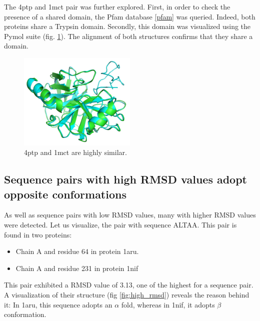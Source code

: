 \documentclass[a4paper, 11pt]{article} %
\begin{document}
The 4ptp and 1mct pair was further explored. First, in order to check the presence of a shared domain, the Pfam database \ref{pfam} was queried. Indeed, both proteins share a Trypsin domain. Secondly, this domain was visualized using the Pymol suite (fig. \ref{fig:perfect_match}). The alignment of both structures confirms that they share a domain.

\begin{figure}[!h]
\begin{center}
    \includegraphics[width = 0.5\textwidth]{../plots/perfect_match_white.png}
  \end{center}
  \label{fig:perfect_match}
  \caption{4ptp and 1mct are highly similar.}
\end{figure}

\subsection{Sequence pairs with high RMSD values adopt opposite conformations}

As well as sequence pairs with low RMSD values, many with higher RMSD values were detected. Let us visualize, the pair with sequence ALTAA. This pair is found in two proteins:

\begin{itemize}

\item Chain A and residue 64 in protein 1aru.

\item Chain A and residue 231 in protein 1nif

\end{itemize} 

This pair exhibited a RMSD value of 3.13, one of the highest for a sequence pair. A visualization of their structure (fig \ref{fig:high_rmsd}) reveals the reason behind it: In 1aru, this sequence adopts an $\alpha$ fold, whereas in 1nif, it adopts $\beta$ conformation.
\end{document}

